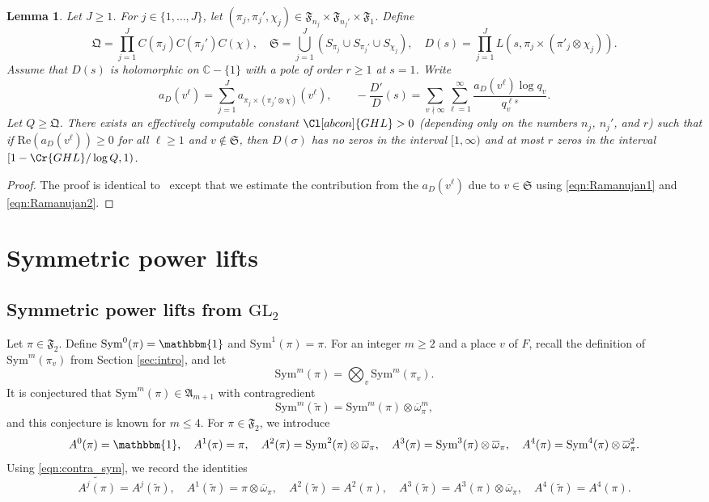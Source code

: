 \documentclass[11pt]{amsart}
\newtheorem{lemma}[theorem]{Lemma}
\theoremstyle{remark}
\newcommand{\Sym}{\mathrm{Sym}}
\renewcommand{\tilde}{\widetilde}
\numberwithin{equation}{section}
\begin{document}
\begin{lemma}
	\label{lem:GHL}
Let $J\geq 1$.  For $j\in\{1,\ldots,J\}$, let $(\pi_j,\pi_j',\chi_j)\in\mathfrak{F}_{n_j}\times\mathfrak{F}_{n_j'}\times\mathfrak{F}_{1}$.  Define
\[
\mathfrak{Q} = \prod_{j = 1}^
   J C (\pi_j) C (\pi_j') C (\chi),\quad \mathfrak {S} = \bigcup_ {j = 1}^J (S_{\pi_j}\cup S_{\pi_j'}\cup S_{\chi_j}),\quad D(s) =  \prod_{j = 1}^J L(s, \pi_j\times(\pi' _j\otimes\chi_j)).
\]
Assume that $D(s)$ is holomorphic on $\mathbb{C}-\{1\}$ with a pole of order $r\geq 1$ at $s=1$.  Write
\begin{equation}
\label{eqn:aDdef}
a_D(v^{\ell})=\sum_{j=1}^J a_{\pi_j\times(\pi_j'\otimes\chi)}(v^{\ell}),\qquad -\frac{D'}{D}(s) = \sum_{v\nmid\infty}\sum_{\ell=1}^{\infty}\frac{a_D(v^{\ell})\log q_v}{q_v^{\ell s}}.
\end{equation}
Let $Q \geq \mathfrak{Q}$.  There exists an effectively computable constant $\Cl[abcon]{GHL}>0$ (depending only on the numbers $n_j$, $n_j'$, and $r$) such that if $\mathrm{Re}(a_D(v^{\ell}))\geq 0$ for all $\ell\geq 1$ and $v\notin\mathfrak{S}$, then $D(\sigma)$ has no zeros in the interval $[1,\infty)$ and at most $r$ zeros in the interval $[1-\Cr{GHL}/\log Q,1)$.
\end{lemma}
\begin{proof}
The proof is identical to~\cite[Lemma~5.9]{IK} except that we estimate the contribution from the $a_D(v^{\ell})$ due to $v\in\mathfrak{S}$ using \eqref{eqn:Ramanujan1} and \eqref{eqn:Ramanujan2}.
\end{proof}

\section{Symmetric power lifts}
\label{sec:symm}

\subsection{Symmetric power lifts from $\mathrm{GL}_2$}
\label{subsec:symm}

Let $\pi\in\mathfrak{F}_{2}$.  Define $\mathrm{Sym}^0(\pi)=\mathbbm{1}$ and $\mathrm{Sym}^1(\pi)=\pi$.  For an integer $m\geq 2$ and a place $v$ of $F$, recall the definition of $\Sym^m(\pi_v)$ from Section \ref{sec:intro}, and let
\[
\Sym^m(\pi)=\bigotimes_v \Sym^m(\pi_v).
\]
It is conjectured that $\mathrm{Sym}^{m}(\pi)\in\mathfrak{A}_{m+1}$ with contragredient
\begin{equation}
\label{eqn:contra_sym}
\mathrm{Sym}^{m}(\widetilde{\pi})=\mathrm{Sym}^{m}(\pi)\otimes\overline{\omega}_{\pi}^{m},
\end{equation}
and this conjecture is known for $m\leq 4$.  For $\pi\in\mathfrak{F}_2$, we introduce
\[
A^0(\pi)=\mathbbm{1},~~~A^1(\pi)=\pi,~~~A^2(\pi)=\Sym^2(\pi)\otimes\overline{\omega}_{\pi},~~~A^3(\pi)=\Sym^3(\pi)\otimes\overline{\omega}_{\pi},~~~A^4(\pi)=\Sym^4(\pi)\otimes\overline{\omega}_{\pi}^2.
\]
Using \eqref{eqn:contra_sym}, we record the identities
\[
\tilde{A^j(\pi)}=A^j(\tilde{\pi}),\quad A^1(\tilde{\pi})=\pi\otimes\overline{\omega}_{\pi},\quad A^2(\tilde{\pi})=A^2(\pi),\quad A^3(\tilde{\pi})=A^3(\pi)\otimes\overline{\omega}_{\pi},\quad A^4(\tilde{\pi})=A^4(\pi).
\]
\end{document}
